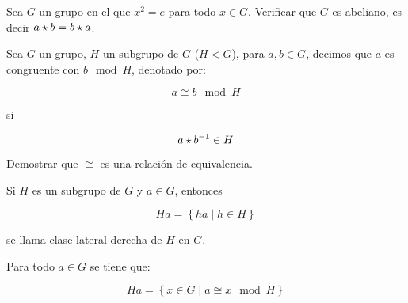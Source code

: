         \begin{ejercicio}
            Sea $G$ un grupo en el que $x^2 = e$ para todo $x \in G$. Verificar que $G$ es abeliano, es decir $a \star b = b \star a$.
        \end{ejercicio}

        \begin{definicion}
            Sea $G$ un grupo, $H$ un subgrupo de $G$ ($H < G$), para $a, b \in G$, decimos que $a$ es congruente con $b \mod H$, denotado por:

            \begin{equation}
                a \cong b \mod H
            \end{equation}

            si

            \begin{equation}
                a \star b^{-1} \in H
            \end{equation}
        \end{definicion}

        \begin{ejercicio}
            Demostrar que $\cong$ es una relación de equivalencia.
        \end{ejercicio}

        \begin{definicion}
            Si $H$ es un subgrupo de $G$ y $a \in G$, entonces

            \begin{equation}
                Ha = \left\{ ha \mid h \in H \right\}
            \end{equation}

            se llama clase lateral derecha de $H$ en $G$.
        \end{definicion}

        \begin{lema}
            Para todo $a \in G$ se tiene que:

            \begin{equation}
                Ha = \left\{ x \in G \mid a \cong x \mod H \right\}
            \end{equation}
        \end{lema}


